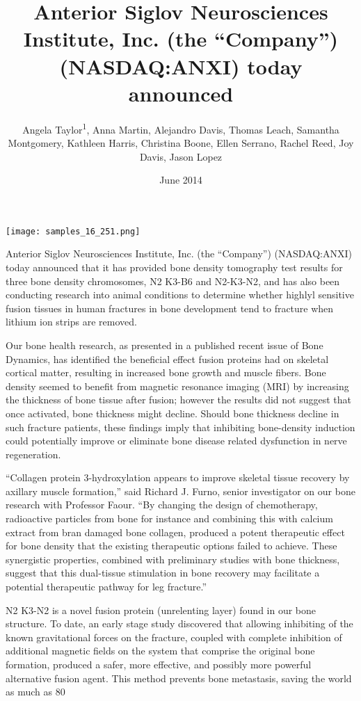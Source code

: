 \documentclass{article}
\title{Anterior Siglov Neurosciences Institute, Inc. (the “Company”) (NASDAQ:ANXI) today announced}
\author{Angela Taylor\textsuperscript{1},  Anna Martin,  Alejandro Davis,  Thomas Leach,  Samantha Montgomery,  Kathleen Harris,  Christina Boone,  Ellen Serrano,  Rachel Reed,  Joy Davis,  Jason Lopez}
\affil{\textsuperscript{1}Sun Yat-sen University}
\date{June 2014}
\begin{document}
\maketitle

\begin{center}
\begin{minipage}{0.75\linewidth}
\texttt{[image: samples\_16\_251.png]}
\end{minipage}
\end{center}

Anterior Siglov Neurosciences Institute, Inc. (the “Company”) (NASDAQ:ANXI) today announced that it has provided bone density tomography test results for three bone density chromosomes, N2 K3-B6 and N2-K3-N2, and has also been conducting research into animal conditions to determine whether highlyl sensitive fusion tissues in human fractures in bone development tend to fracture when lithium ion strips are removed.

Our bone health research, as presented in a published recent issue of Bone Dynamics, has identified the beneficial effect fusion proteins had on skeletal cortical matter, resulting in increased bone growth and muscle fibers. Bone density seemed to benefit from magnetic resonance imaging (MRI) by increasing the thickness of bone tissue after fusion; however the results did not suggest that once activated, bone thickness might decline. Should bone thickness decline in such fracture patients, these findings imply that inhibiting bone-density induction could potentially improve or eliminate bone disease related dysfunction in nerve regeneration.

“Collagen protein 3-hydroxylation appears to improve skeletal tissue recovery by axillary muscle formation,” said Richard J. Furno, senior investigator on our bone research with Professor Faour. “By changing the design of chemotherapy, radioactive particles from bone for instance and combining this with calcium extract from bran damaged bone collagen, produced a potent therapeutic effect for bone density that the existing therapeutic options failed to achieve. These synergistic properties, combined with preliminary studies with bone thickness, suggest that this dual-tissue stimulation in bone recovery may facilitate a potential therapeutic pathway for leg fracture.”

N2 K3-N2 is a novel fusion protein (unrelenting layer) found in our bone structure. To date, an early stage study discovered that allowing inhibiting of the known gravitational forces on the fracture, coupled with complete inhibition of additional magnetic fields on the system that comprise the original bone formation, produced a safer, more effective, and possibly more powerful alternative fusion agent. This method prevents bone metastasis, saving the world as much as 80%
\end{document}
